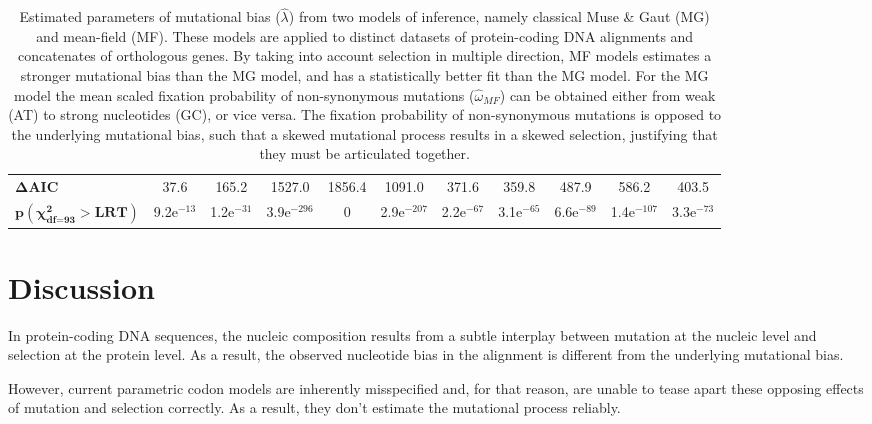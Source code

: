 \documentclass{article}
\begin{document}
\begin{table}[h]
{\begin{tabu}{l||c|c|c|c|c|c|c|c|c|c|}
 \textbf{$\bm{\Delta}$AIC} & 37.6 & 165.2 & 1527.0 & 1856.4 & 1091.0 & 371.6 & 359.8 & 487.9 & 586.2 & 403.5 \\
 \textbf{$\bm{p\left( \chi_{\text{df=}93}^2 > \text{LRT}\right)}$} & 9.2e$^{-13}$ & 1.2e$^{-31}$ & 3.9e$^{-296}$ & 0 & 2.9e$^{-207}$ & 2.2e$^{-67}$ & 3.1e$^{-65}$ & 6.6e$^{-89}$ & 1.4e$^{-107}$ & 3.3e$^{-73}$ \\
 \bottomrule
 \end{tabu}}
 \caption[Estimated parameters]{
 Estimated parameters of mutational bias ($\widehat{\lambda}$) from two models of inference, namely classical Muse \& Gaut ({MG}) and mean-field ({MF}).
 These models are applied to distinct datasets of protein-coding {DNA} alignments and concatenates of orthologous genes.
 By taking into account selection in multiple direction, {MF} models estimates a stronger mutational bias than the {MG} model, and has a statistically better fit than the MG model.
 For the {MG} model the mean scaled fixation probability of {non-synonymous} mutations ($\widehat{\omega}_{MF}$) can be obtained either from weak (AT) to strong nucleotides (GC), or vice versa.
 The fixation probability of {non-synonymous} mutations is opposed to the underlying mutational bias, such that a skewed mutational process results in a skewed selection, justifying that they must be articulated together.
 }
 \label{tab:mut-bias-estimation}
\end{table}

\section{Discussion}\label{sec:discussion}

In protein-coding {DNA} sequences, the nucleic composition results from a subtle interplay between mutation at the nucleic level and selection at the protein level.
As a result, the observed nucleotide bias in the alignment is different from the underlying mutational bias.

However, current parametric codon models are inherently misspecified and, for that reason, are unable to tease apart these opposing effects of mutation and selection correctly.
As a result, they don’t estimate the mutational process reliably.
\end{document}
